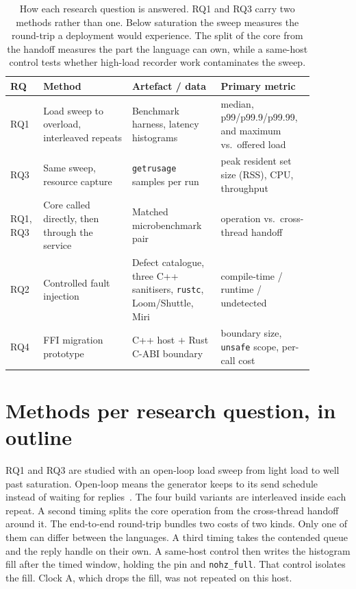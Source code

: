 \documentclass[english,oneside,a4paper,censored,csm,software-track-2020]{HYthesisML}
\begin{document}
\begin{table}[ht]
\centering
\small
\caption[How each research question is answered]{How each research question is
answered. RQ1 and RQ3 carry two methods rather than one. Below saturation the
sweep measures the round-trip a deployment would experience. The split of the
core from the handoff measures the part the language can own, while a
same-host control tests whether high-load recorder work contaminates the sweep.
\label{tab:design}}
\renewcommand{\arraystretch}{1.2}
\setlength{\tabcolsep}{4pt}
\begin{tabular}{@{}p{0.07\linewidth} p{0.27\linewidth} p{0.27\linewidth} p{0.27\linewidth}@{}}
\hline\hline
RQ & Method & Artefact / data & Primary metric \\
\hline
RQ1 & Load sweep to overload, interleaved repeats & Benchmark harness, latency histograms &
median, p99/p99.9/p99.99, and maximum vs.\ offered load \\
RQ3 & Same sweep, resource capture & \texttt{getrusage} samples per run &
peak resident set size (RSS), CPU, throughput \\
RQ1, RQ3 & Core called directly, then through the service &
Matched microbenchmark pair &
operation vs.\ cross-thread handoff \\
RQ2 & Controlled fault injection & Defect catalogue, three C++ sanitisers,
\texttt{rustc}, Loom/Shuttle, Miri &
compile-time / runtime / undetected \\
RQ4 & FFI migration prototype & C++ host $+$ Rust C-ABI boundary &
boundary size, \texttt{unsafe} scope, per-call cost \\
\hline
\end{tabular}
\end{table}

\section[Methods per research question]{Methods per research question, in outline}\label{sec:methodbrief}
RQ1 and RQ3 are studied with an open-loop load sweep from light load to well
past saturation. Open-loop means the generator keeps to its send schedule
instead of waiting for replies~\cite{schroeder2006openclosed}. The four build
variants are interleaved inside each repeat. A second timing splits the core operation
from the cross-thread handoff around it. The end-to-end round-trip bundles two
costs of two kinds. Only one of them can differ between the languages. A third
timing takes the contended queue and the reply handle on their own. A
same-host control then writes the histogram fill after the timed window,
holding the pin and \texttt{nohz\_full}. That control isolates the fill.
Clock A, which drops the fill, was not repeated on this host.
\end{document}
